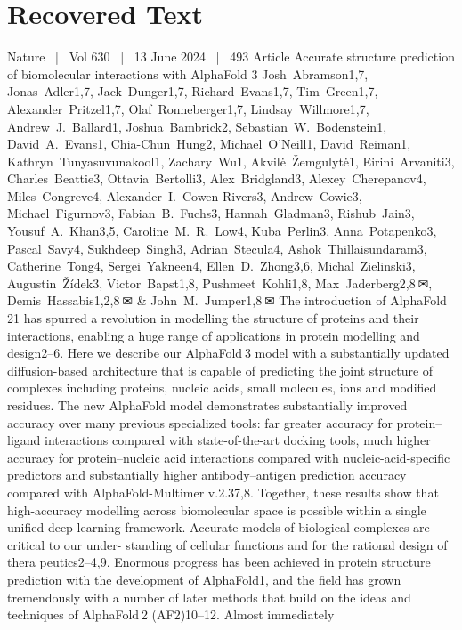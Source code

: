 \section{Recovered Text}
Nature  |  Vol 630  |  13 June 2024  |  493
Article
Accurate structure prediction of
biomolecular interactions with AlphaFold 3
Josh Abramson1,7, Jonas Adler1,7, Jack Dunger1,7, Richard Evans1,7, Tim Green1,7,
Alexander Pritzel1,7, Olaf Ronneberger1,7, Lindsay Willmore1,7, Andrew J. Ballard1,
Joshua Bambrick2, Sebastian W. Bodenstein1, David A. Evans1, Chia-Chun Hung2,
Michael O’Neill1, David Reiman1, Kathryn Tunyasuvunakool1, Zachary Wu1, Akvilė Žemgulytė1,
Eirini Arvaniti3, Charles Beattie3, Ottavia Bertolli3, Alex Bridgland3, Alexey Cherepanov4,
Miles Congreve4, Alexander I. Cowen-Rivers3, Andrew Cowie3, Michael Figurnov3,
Fabian B. Fuchs3, Hannah Gladman3, Rishub Jain3, Yousuf A. Khan3,5, Caroline M. R. Low4,
Kuba Perlin3, Anna Potapenko3, Pascal Savy4, Sukhdeep Singh3, Adrian Stecula4,
Ashok Thillaisundaram3, Catherine Tong4, Sergei Yakneen4, Ellen D. Zhong3,6,
Michal Zielinski3, Augustin Žídek3, Victor Bapst1,8, Pushmeet Kohli1,8, Max Jaderberg2,8 ✉,
Demis Hassabis1,2,8 ✉ \& John M. Jumper1,8 ✉
The introduction of AlphaFold 21 has spurred a revolution in modelling the structure
of proteins and their interactions, enabling a huge range of applications in protein
modelling and design2–6. Here we describe our AlphaFold 3 model with a substantially
updated diffusion-based architecture that is capable of predicting the joint structure
of complexes including proteins, nucleic acids, small molecules, ions and modified
residues. The new AlphaFold model demonstrates substantially improved accuracy
over many previous specialized tools: far greater accuracy for protein–ligand
interactions compared with state-of-the-art docking tools, much higher accuracy
for protein–nucleic acid interactions compared with nucleic-acid-specific predictors
and substantially higher antibody–antigen prediction accuracy compared with
AlphaFold-Multimer v.2.37,8. Together, these results show that high-accuracy
modelling across biomolecular space is possible within a single unified deep-learning
framework.
Accurate models of biological complexes are critical to our under-
standing of cellular functions and for the rational design of thera­
peutics2–4,9. Enormous progress has been achieved in protein structure
prediction with the development of AlphaFold1, and the field has
grown tremendously with a number of later methods that build on
the ideas and techniques of AlphaFold 2 (AF2)10–12. Almost immediately
